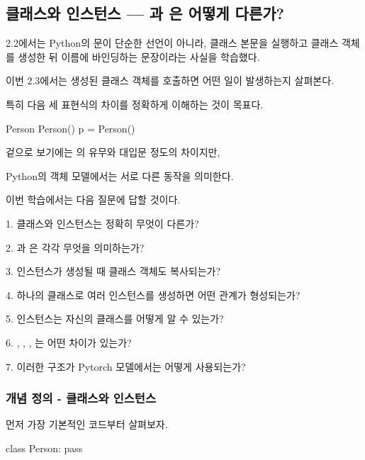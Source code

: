 

\subsection{클래스와 인스턴스 — 과 은 어떻게 다른가?}

2.2에서는 Python의 문이 단순한 선언이 아니라, 클래스 본문을 실행하고 클래스 객체를 생성한 뒤 이름에 바인딩하는 문장이라는 사실을 학습했다.

이번 2.3에서는 생성된 클래스 객체를 호출하면 어떤 일이 발생하는지 살펴본다.

특히 다음 세 표현식의 차이를 정확하게 이해하는 것이 목표다.

\begin{dhkcode}
Person
Person()
p = Person()
\end{dhkcode}

겉으로 보기에는 \zsh{()} 의 유무와 대입문 정도의 차이지만,

Python의 객체 모델에서는 서로 다른 동작을 의미한다.

이번 학습에서는 다음 질문에 답할 것이다.

\begin{dhksmry}
1. 클래스와 인스턴스는 정확히 무엇이 다른가?

2. 과 은 각각 무엇을 의미하는가?

3. 인스턴스가 생성될 때 클래스 객체도 복사되는가?

4. 하나의 클래스로 여러 인스턴스를 생성하면 어떤 관계가 형성되는가?

5. 인스턴스는 자신의 클래스를 어떻게 알 수 있는가?

6. , \zsh{==}, , 는 어떤 차이가 있는가?

7. 이러한 구조가 Pytorch 모델에서는 어떻게 사용되는가?
\end{dhksmry}

\subsubsection{개념 정의 - 클래스와 인스턴스}

먼저 가장 기본적인 코드부터 살펴보자.

\begin{dhkcode}
class Person:
    pass
\end{dhkcode}

